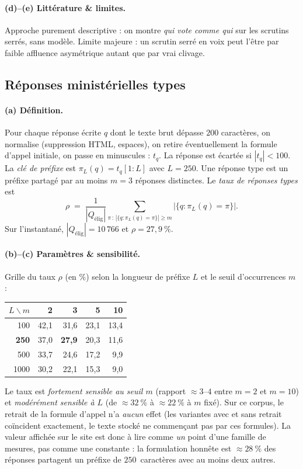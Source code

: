 \documentclass[11pt,a4paper]{article}
\begin{document}
\paragraph{(d)--(e) Littérature \& limites.} Approche purement descriptive : on
montre \emph{qui vote comme qui} sur les scrutins serrés, sans modèle. Limite
majeure : un scrutin \og{}serré en voix\fg{} peut l'être par faible affluence
asymétrique autant que par vrai clivage.

\subsection{Réponses ministérielles \og{}types\fg{}}\label{sec:templates}

\paragraph{(a) Définition.} Pour chaque réponse écrite $q$ dont le texte brut
dépasse $200$ caractères, on normalise (suppression HTML, espaces), on retire
éventuellement la formule d'appel initiale, on passe en minuscules : $t_q$. La
réponse est écartée si $|t_q|<100$. La \emph{clé de préfixe} est
$\pi_L(q)=t_q[1:L]$ avec $L=250$. Une \og{}réponse type\fg{} est un préfixe partagé
par au moins $m=3$ réponses distinctes. Le \emph{taux de réponses types} est
\[
\rho \;=\; \frac{1}{|Q_{\text{élig}}|}\sum_{\pi \,:\, |\{q:\pi_L(q)=\pi\}|\ge m} \big|\{q:\pi_L(q)=\pi\}\big|.
\]
Sur l'instantané, $|Q_{\text{élig}}|=10\,766$ et $\rho=27{,}9~\%$.

\paragraph{(b)--(c) Paramètres \& sensibilité.} Grille du taux $\rho$ (en \%) selon
la longueur de préfixe $L$ et le seuil d'occurrences $m$ :
\begin{center}\small
\begin{tabular}{r|rrrr}
\toprule
$L\backslash m$ & 2 & \textbf{3} & 5 & 10 \\
\midrule
100  & 42,1 & 31,6 & 23,1 & 13,4 \\
\textbf{250}  & 37,0 & \textbf{27,9} & 20,3 & 11,6 \\
500  & 33,7 & 24,6 & 17,2 & \phantom{0}9,9 \\
1000 & 30,2 & 22,1 & 15,3 & \phantom{0}9,0 \\
\bottomrule
\end{tabular}
\end{center}
Le taux est \emph{fortement sensible au seuil $m$} (rapport $\approx 3$--$4$ entre
$m=2$ et $m=10$) et \emph{modérément sensible à $L$} (de $\approx 32~\%$ à
$\approx 22~\%$ à $m$ fixé). Sur ce corpus, le retrait de la formule d'appel n'a
\emph{aucun} effet (les variantes \og{}avec\fg{} et \og{}sans\fg{} retrait
coïncident exactement, le texte stocké ne commençant pas par ces formules). La
valeur affichée sur le site est donc à lire comme \emph{un} point d'une famille de
mesures, pas comme une constante : la formulation honnête est \og{}$\approx 28~\%$
des réponses partagent un préfixe de $250$~caractères avec au moins deux autres\fg{}.
\end{document}
